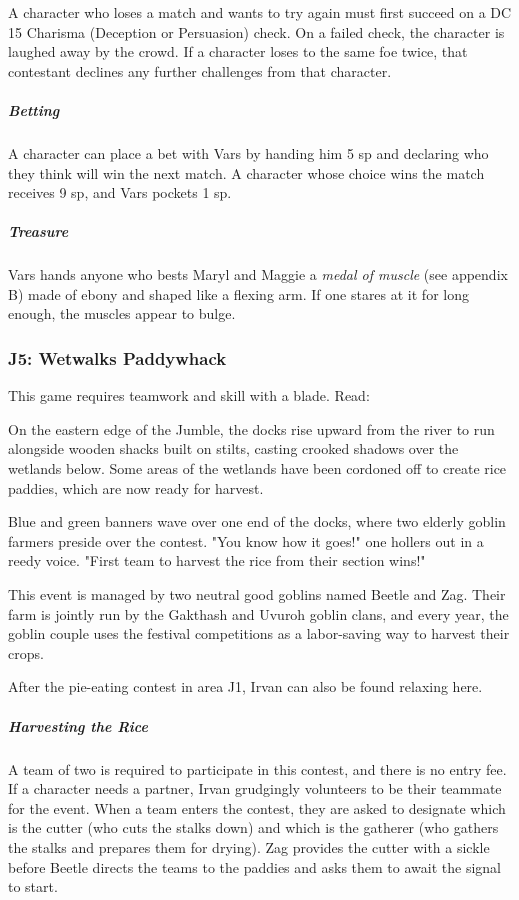\documentclass[10pt,a4paper,twoside,fancy,bg=print,twocolumn,openany,nodeprecatedcode]{dndbook}
\begin{document}
A character who loses a match and wants to try again must first succeed on a DC 15 Charisma (Deception or Persuasion) check. On a failed check, the character is laughed away by the crowd. If a character loses to the same foe twice, that contestant declines any further challenges from that character.

\subparagraph{Betting}
A character can place a bet with Vars by handing him 5 sp and declaring who they think will win the next match. A character whose choice wins the match receives 9 sp, and Vars pockets 1 sp.

\subparagraph{Treasure}
Vars hands anyone who bests Maryl and Maggie a \textit{medal of muscle} (see appendix B) made of ebony and shaped like a flexing arm. If one stares at it for long enough, the muscles appear to bulge.

\subsubsection{J5: Wetwalks Paddywhack}
This game requires teamwork and skill with a blade. Read:

\begin{DndReadAloud}{}
On the eastern edge of the Jumble, the docks rise upward from the river to run alongside wooden shacks built on stilts, casting crooked shadows over the wetlands below. Some areas of the wetlands have been cordoned off to create rice paddies, which are now ready for harvest.

Blue and green banners wave over one end of the docks, where two elderly goblin farmers preside over the contest. "You know how it goes!" one hollers out in a reedy voice. "First team to harvest the rice from their section wins!"

\end{DndReadAloud}

This event is managed by two neutral good goblins named Beetle and Zag. Their farm is jointly run by the Gakthash and Uvuroh goblin clans, and every year, the goblin couple uses the festival competitions as a labor-saving way to harvest their crops.

After the pie-eating contest in area J1, Irvan can also be found relaxing here.

\subparagraph{Harvesting the Rice}
A team of two is required to participate in this contest, and there is no entry fee. If a character needs a partner, Irvan grudgingly volunteers to be their teammate for the event. When a team enters the contest, they are asked to designate which is the cutter (who cuts the stalks down) and which is the gatherer (who gathers the stalks and prepares them for drying). Zag provides the cutter with a sickle before Beetle directs the teams to the paddies and asks them to await the signal to start.
\end{document}

